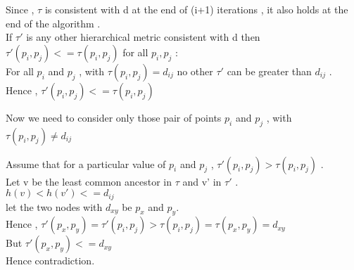\documentclass[11pt]{article}
\begin{document}
Since , $\tau$ is consistent with d at the end of (i+1) iterations , it also holds at the end of the algorithm .\\



If $\tau'$ is any other hierarchical metric consistent with d  then $\tau'(p_i,p_j) <= \tau(p_i,p_j) $ for all $p_i, p_j$ :\\

For all $p_i$ and $p_j$ , with $\tau(p_i,p_j) = d_{ij}$ no other $\tau'$ can be greater than $d_{ij}$ . Hence , $\tau'(p_i,p_j) <= \tau(p_i,p_j) $

Now we need to consider only those pair of points $p_i$ and $p_j$ , with $\tau(p_i,p_j) \neq d_{ij}$

Assume that for a particular value of $p_i$ and $p_j$ , $\tau'(p_i,p_j) > \tau(p_i,p_j)$  . \\
Let v be the least common ancestor in $\tau$ and v' in $\tau'$ . \\
$h(v) < h(v') <= d_{ij}$ \\
let the two nodes with $d_{xy}$ be $p_x$ and $p_y$. \\
Hence , $\tau'(p_x,p_y) = \tau'(p_i,p_j) > \tau(p_i,p_j) = \tau(p_x,p_y) = d_{xy} $ \\ 
But $\tau'(p_x,p_y) <= d_{xy} $ \\
Hence contradiction. 



\pagebreak
\end{document}
